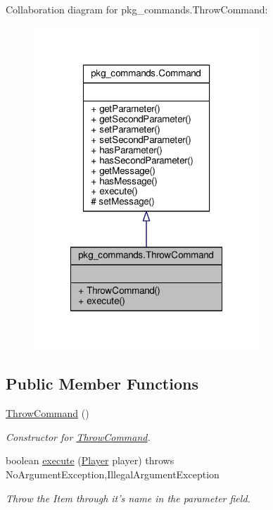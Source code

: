 Collaboration diagram for pkg\-\_\-commands.\-Throw\-Command\-:\nopagebreak
\begin{figure}[H]
\begin{center}
\leavevmode
\includegraphics[width=240pt]{classpkg__commands_1_1ThrowCommand__coll__graph}
\end{center}
\end{figure}
\subsection*{Public Member Functions}
\begin{DoxyCompactItemize}
\item 
\hyperlink{classpkg__commands_1_1ThrowCommand_a3332c8c15bf1a0a4ce85814406dbbfa6}{Throw\-Command} ()
\begin{DoxyCompactList}\small\item\em Constructor for \hyperlink{classpkg__commands_1_1ThrowCommand}{Throw\-Command}. \end{DoxyCompactList}\item 
boolean \hyperlink{classpkg__commands_1_1ThrowCommand_a38d936bcebcf45936324caf0f417b012}{execute} (\hyperlink{classpkg__world_1_1Player}{Player} player)  throws No\-Argument\-Exception,\-Illegal\-Argument\-Exception 
\begin{DoxyCompactList}\small\item\em Throw the Item through it's name in the parameter field. \end{DoxyCompactList}\end{DoxyCompactItemize}

